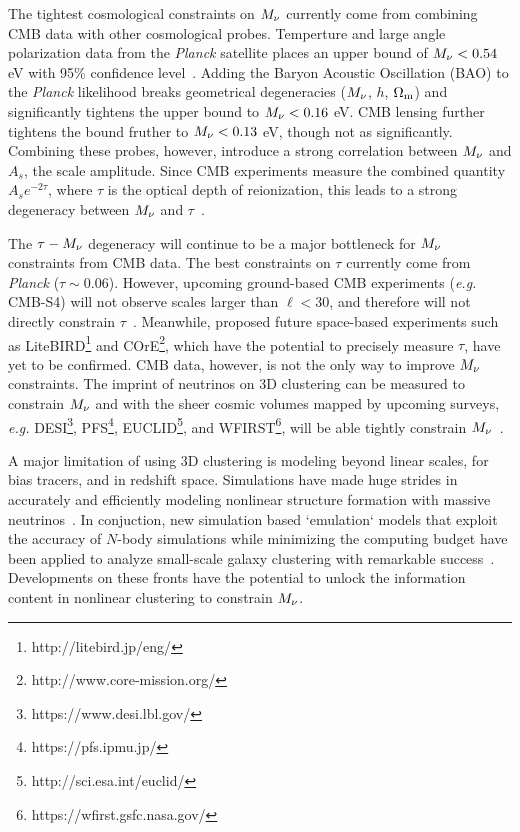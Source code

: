 The tightest cosmological constraints on $M_\nu$ currently come from 
combining CMB data with other cosmological probes. Temperture and large 
angle polarization data from the {\em Planck} satellite places an upper 
bound of $M_\nu < 0.54$ eV with 95\% confidence level~\citep{planckcollaboration2018}. 
Adding the Baryon Acoustic Oscillation (BAO) to the {\em Planck} 
likelihood breaks geometrical degeneracies ($M_\nu$, $h$, $\Omega_{\rm m}$) 
and significantly tightens the upper bound to $M_\nu < 0.16$ eV. CMB 
lensing further tightens the bound fruther to $M_\nu < 0.13$ eV, though 
not as significantly. Combining these probes, however, introduce a strong 
correlation between $M_\nu$ and $A_s$, the scale amplitude. Since CMB 
experiments measure the combined quantity $A_s e^{-2\tau}$, where 
$\tau$ is the optical depth of reionization, this leads to a strong 
degeneracy between $M_\nu$ and $\tau$~\citep{allison2015, liu2016, archidiacono2017}. 

The $\tau-M_\nu$ degeneracy will continue to be a major bottleneck 
for $M_\nu$ constraints from CMB data. The best constraints on $\tau$ 
currently come from {\em Planck} ($\tau\sim0.06$). However, upcoming 
ground-based CMB experiments ({\em e.g.} CMB-S4) will not observe scales 
larger than $\ell < 30$, and therefore will not directly constrain 
$\tau$~\citep{abazajian2016}. Meanwhile, proposed future space-based 
experiments such as LiteBIRD\footnote{http://litebird.jp/eng/} and 
COrE\footnote{http://www.core-mission.org/}, which have the potential 
to precisely measure $\tau$, have yet to be confirmed. CMB data, however, 
is not the only way to improve $M_\nu$ constraints. The imprint of 
neutrinos on 3D clustering can be measured to constrain $M_\nu$ and 
with the sheer cosmic volumes mapped by upcoming surveys, \emph{e.g.} 
DESI\footnote{https://www.desi.lbl.gov/}, PFS\footnote{https://pfs.ipmu.jp/}, 
EUCLID\footnote{http://sci.esa.int/euclid/}, and WFIRST\footnote{https://wfirst.gsfc.nasa.gov/}, 
will be able tightly constrain $M_\nu$~\citep{audren2013, font-ribera2014, petracca2016, sartoris2016, boyle2018}.

A major limitation of using 3D clustering is modeling beyond linear 
scales, for bias tracers, and in redshift space. Simulations have made
huge strides in accurately and efficiently modeling nonlinear structure
formation with massive neutrinos~\citep[\emph{e.g.}][]{brandbyge2008, 
villaescusa-navarro2013, castorina2015, adamek2017, emberson2017, villaescusa-navarro2018}. 
In conjuction, new simulation based `emulation` models that exploit the 
accuracy of $N$-body simulations while minimizing the computing budget 
have been applied to analyze small-scale galaxy clustering with remarkable 
success~\citep[\emph{e.g.}][]{heitmann2009, kwan2015, euclidcollaboration2018, mcclintock2018, zhai2018, wibking2019}. 
Developments on these fronts have the potential to unlock the information 
content in nonlinear clustering to constrain $M_\nu$. 

